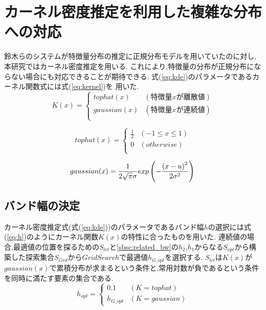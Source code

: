 \section{カーネル密度推定を利用した複雑な分布への対応}
\label{sc:mix_gaussian}
鈴木らのシステム\cite{Suzuki}が特徴量分布の推定に正規分布モデルを用いていたのに対し,本研究ではカーネル密度推定を用いる.
これにより,特徴量の分布が正規分布にならない場合にも対応できることが期待できる.
式(\ref{eq:kde})のパラメータであるカーネル関数式には式(\ref{eq:kernel})を
用いた.
\begin{equation}
\label{eq:kernel}
K(x)=\left\{
\begin{array}{ll}
  tophat(x) & (特徴量xが離散値) \\
  gaussian(x) & (特徴量xが連続値) \\
\end{array} \right.
\end{equation}

\begin{equation}
  \label{eq:tophat}
  tophat(x)=\left\{
  \begin{array}{ll}
    \frac{1}{2} &(-1 \leq x \leq 1) \\
    0 &(otherwise) \\
  \end{array} \right.
\end{equation}

\begin{equation}
  \label{eq:gaussian}
  gaussian(x)=
  \frac{1}{2\sqrt{\pi}\sigma}exp\left(-\frac{{(x-u)}^2}{2{\sigma}^2}\right) \\
\end{equation}

\subsection{バンド幅の決定}
カーネル密度推定式(式(\ref{eq:kde}))のパラメータであるバンド幅$h$の選択には式(\ref{eq:h})のようにカーネル関数$K(x)$の特性に合ったものを用いた.
連続値の場合,最適値の位置を探るための$S_{lct}$と\ref{sbsc:related_bw}の$h_{2}$,$h_{1}$からなる$S_{opt}$から構築した探索集合$S_{Grd}$から$GridSearch$で最適値$h_{G\_opt}$を選択する.
$S_{lct}$は$K(x)$が$gaussian(x)$で累積分布が求まるという条件と,常用対数が負であるという条件を同時に満たす要素の集合である.\\
\begin{equation}
  \label{eq:h}
  h_{opt}=\left\{
    \begin{array}{ll}
  0.1 &(K=tophat)\\
  h_{G\_opt} &(K=gaussian)
\end{array}\right.
\end{equation}

